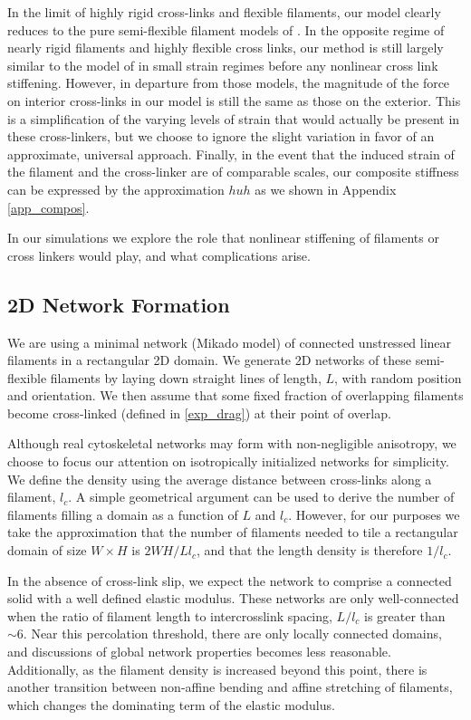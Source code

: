 \documentclass[pre,preprint]{revtex4-1}
\begin{document}
In the limit of highly rigid cross-links and flexible filaments, our model clearly reduces to the pure semi-flexible filament models of \cite{theo_hlm,theo_hlm2}.  In the opposite regime of nearly rigid filaments and highly flexible cross links, our method is still largely similar to the model of \cite{theo_crosslinknonlinear} in small strain regimes before any nonlinear cross link stiffening.  However, in departure from those models, the magnitude of the force on interior cross-links in our model is still the same as those on the exterior.  This is a simplification of the varying levels of strain that would actually be present in these cross-linkers, but we choose to ignore the slight variation in favor of an approximate, universal approach.  Finally, in the event that the induced strain of the filament and the cross-linker are of comparable scales, our composite stiffness can be expressed by the approximation $huh$ as we shown in Appendix \ref{app_compos}.

In our simulations we explore the role that nonlinear stiffening of filaments or cross linkers would play, and what complications arise.

\subsection{2D Network Formation}

We are using a minimal network (Mikado model) of connected unstressed linear filaments in a rectangular 2D domain.  We generate 2D networks of these semi-flexible filaments by laying down straight lines of length, $L$, with random position and orientation. We then assume that some fixed fraction of overlapping filaments become cross-linked (defined in \ref{exp_drag}) at their point of overlap.

Although real cytoskeletal networks may form with non-negligible anisotropy, we choose to focus our attention on isotropically initialized networks for simplicity.  We define the density using the average distance between cross-links along a filament, $l_c$. A simple geometrical argument can be used to derive the number of filaments filling a domain as a function of $L$ and $l_c$\cite{theo_hlm}.  However, for our purposes we take the approximation that the number of filaments needed to tile a rectangular domain of size $W \times H$  is $2WH/Ll_c$, and that the length density is therefore $1/l_c$. 

In the absence of cross-link slip, we expect the network to comprise a connected solid with a well defined elastic modulus\cite{theo_hlm,theo_hlm2}.  These networks are only well-connected when the ratio of filament length to intercrosslink spacing, $L/l_c$ is greater than $\sim 6$.  Near this percolation threshold, there are only locally connected domains, and discussions of global network properties becomes less reasonable.  Additionally, as the filament density is increased beyond this point, there is another transition between non-affine bending and affine stretching of filaments, which changes the dominating term of the elastic modulus.
\end{document}
